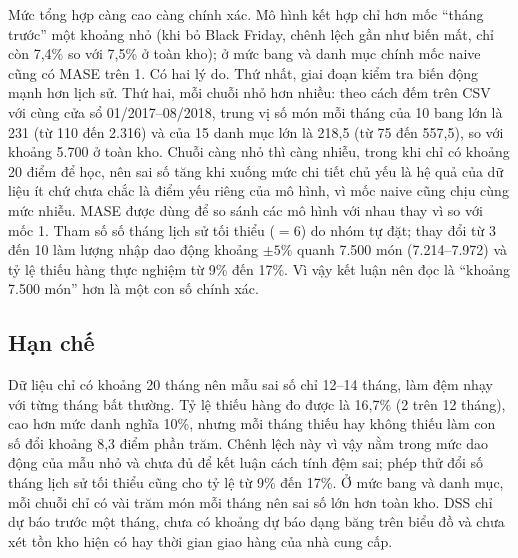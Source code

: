 Mức tổng hợp càng cao càng chính xác. Mô hình kết hợp chỉ hơn mốc ``tháng trước'' một khoảng nhỏ (khi bỏ Black Friday, chênh lệch gần như biến mất, chỉ còn 7,4\% so với 7,5\% ở toàn kho); ở mức bang và danh mục chính mốc naive cũng có MASE trên 1. Có hai lý do. Thứ nhất, giai đoạn kiểm tra biến động mạnh hơn lịch sử. Thứ hai, mỗi chuỗi nhỏ hơn nhiều: theo cách đếm trên CSV với cùng cửa sổ 01/2017--08/2018, trung vị số món mỗi tháng của 10 bang lớn là 231 (từ 110 đến 2.316) và của 15 danh mục lớn là 218,5 (từ 75 đến 557,5), so với khoảng 5.700 ở toàn kho. Chuỗi càng nhỏ thì càng nhiễu, trong khi chỉ có khoảng 20 điểm để học, nên sai số tăng khi xuống mức chi tiết chủ yếu là hệ quả của dữ liệu ít chứ chưa chắc là điểm yếu riêng của mô hình, vì mốc naive cũng chịu cùng mức nhiễu. MASE được dùng để so sánh các mô hình với nhau thay vì so với mốc 1. Tham số số tháng lịch sử tối thiểu ($=6$) do nhóm tự đặt; thay đổi từ 3 đến 10 làm lượng nhập dao động khoảng $\pm 5\%$ quanh 7.500 món (7.214--7.972) và tỷ lệ thiếu hàng thực nghiệm từ 9\% đến 17\%. Vì vậy kết luận nên đọc là ``khoảng 7.500 món'' hơn là một con số chính xác.

\subsection{Hạn chế}
Dữ liệu chỉ có khoảng 20 tháng nên mẫu sai số chỉ 12--14 tháng, làm đệm nhạy với từng tháng bất thường. Tỷ lệ thiếu hàng đo được là 16,7\% (2 trên 12 tháng), cao hơn mức danh nghĩa 10\%, nhưng mỗi tháng thiếu hay không thiếu làm con số đổi khoảng 8,3 điểm phần trăm. Chênh lệch này vì vậy nằm trong mức dao động của mẫu nhỏ và chưa đủ để kết luận cách tính đệm sai; phép thử đổi số tháng lịch sử tối thiểu cũng cho tỷ lệ từ 9\% đến 17\%. Ở mức bang và danh mục, mỗi chuỗi chỉ có vài trăm món mỗi tháng nên sai số lớn hơn toàn kho. DSS chỉ dự báo trước một tháng, chưa có khoảng dự báo dạng băng trên biểu đồ và chưa xét tồn kho hiện có hay thời gian giao hàng của nhà cung cấp.
